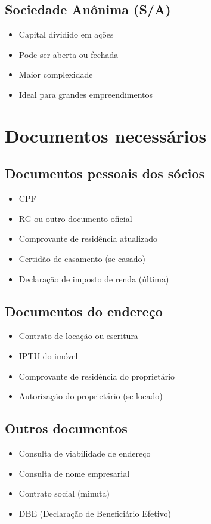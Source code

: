 \documentclass[12pt,a4paper]{article}
\begin{document}
\subsection{Sociedade Anônima (S/A)}
\begin{itemize}
    \item Capital dividido em ações
    \item Pode ser aberta ou fechada
    \item Maior complexidade
    \item Ideal para grandes empreendimentos
\end{itemize}

\section{Documentos necessários}

\subsection{Documentos pessoais dos sócios}
\begin{itemize}
    \item CPF
    \item RG ou outro documento oficial
    \item Comprovante de residência atualizado
    \item Certidão de casamento (se casado)
    \item Declaração de imposto de renda (última)
\end{itemize}

\subsection{Documentos do endereço}
\begin{itemize}
    \item Contrato de locação ou escritura
    \item IPTU do imóvel
    \item Comprovante de residência do proprietário
    \item Autorização do proprietário (se locado)
\end{itemize}

\subsection{Outros documentos}
\begin{itemize}
    \item Consulta de viabilidade de endereço
    \item Consulta de nome empresarial
    \item Contrato social (minuta)
    \item DBE (Declaração de Beneficiário Efetivo)
\end{itemize}
\end{document}
